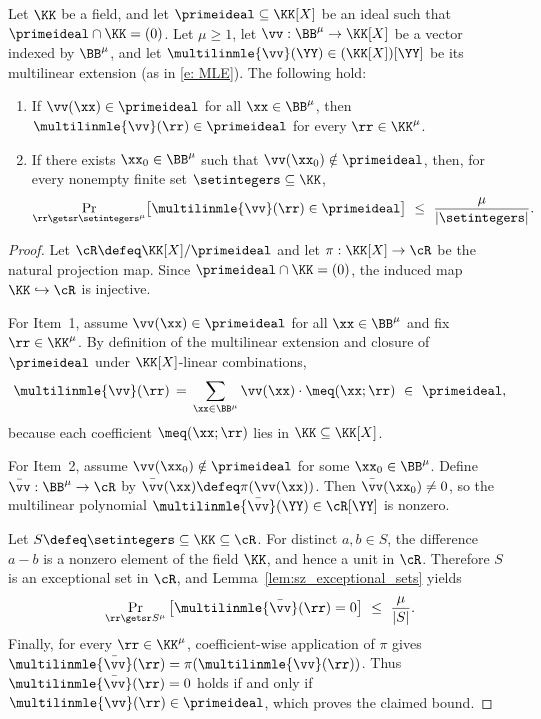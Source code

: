 \begin{lemma}
\label{lem:ideal-batching}
Let $\KK$ be a field, and let $\primeideal\subseteq \KK[X]$ be an ideal such that $\primeideal\cap \KK=(0)$.
Let $\mu\ge 1$, let $\vv:\BB^\mu\to \KK[X]$ be a vector indexed by $\BB^\mu$, and let
$\multilinmle{\vv}(\YY)\in (\KK[X])[\YY]$ be its multilinear extension (as in \eqref{e: MLE}).
The following hold:
\begin{enumerate}
\item If $\vv(\xx)\in\primeideal$ for all $\xx\in\BB^\mu$, then $\multilinmle{\vv}(\rr)\in\primeideal$ for every
$\rr\in \KK^\mu$.
\item If there exists $\xx_0\in\BB^\mu$ such that $\vv(\xx_0)\notin\primeideal$, then, for every nonempty finite set
$\setintegers\subseteq \KK$,
\[
  \Pr_{\rr\getsr \setintegers^\mu}\!\big[\multilinmle{\vv}(\rr)\in\primeideal\big]
  \ \le\
  \frac{\mu}{|\setintegers|}.
\]
\end{enumerate}
\end{lemma}
\begin{proof}
Let $\cR\defeq \KK[X]/\primeideal$ and let $\pi:\KK[X]\to \cR$ be the natural projection map.
Since $\primeideal\cap\KK=(0)$, the induced map $\KK\hookrightarrow \cR$ is injective.

For Item~1, assume $\vv(\xx)\in\primeideal$ for all $\xx\in\BB^\mu$ and fix $\rr\in\KK^\mu$.
By definition of the multilinear extension and closure of $\primeideal$ under $\KK[X]$-linear combinations,
\[
  \multilinmle{\vv}(\rr)
  \,=\,
  \sum_{\xx\in\BB^\mu} \vv(\xx)\cdot \meq(\xx;\rr)
  \ \in\ \primeideal,
\]
because each coefficient $\meq(\xx;\rr)$ lies in $\KK\subseteq \KK[X]$.

For Item~2, assume $\vv(\xx_0)\notin\primeideal$ for some $\xx_0\in\BB^\mu$.
Define $\bar\vv:\BB^\mu\to \cR$ by $\bar\vv(\xx)\defeq \pi(\vv(\xx))$.
Then $\bar\vv(\xx_0)\neq 0$, so the multilinear polynomial $\multilinmle{\bar\vv}(\YY)\in \cR[\YY]$ is nonzero.

Let $S\defeq \setintegers\subseteq \KK\subseteq \cR$.
For distinct $a,b\in S$, the difference $a-b$ is a nonzero element of the field $\KK$, and hence a unit in $\cR$.
Therefore $S$ is an exceptional set in $\cR$, and Lemma~\ref{lem:sz_exceptional_sets} yields
\[
  \Pr_{\rr\getsr S^\mu}\big[\multilinmle{\bar\vv}(\rr)=0\big]\ \le\ \frac{\mu}{|S|}.
\]
Finally, for every $\rr\in\KK^\mu$, coefficient-wise application of $\pi$ gives
$\multilinmle{\bar\vv}(\rr)=\pi(\multilinmle{\vv}(\rr))$.
Thus $\multilinmle{\bar\vv}(\rr)=0$ holds if and only if $\multilinmle{\vv}(\rr)\in\primeideal$, which proves the
claimed bound.
\end{proof}


